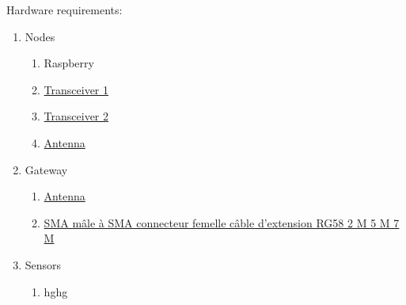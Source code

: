 
Hardware requirements:
	\begin{enumerate}
		\item Nodes
		\begin{enumerate}
			\item Raspberry
			\item \href{http://modtronix.com/inair9.html}
			{Transceiver 1}
			\item \href{https://fr.farnell.com/hoperf/rfm95w-868s2/transceiver-868mhz-fsk-ook/dp/2759294}
			{Transceiver 2}
			\item \href{http://modtronix.com/ant-f105-868.html}
			{Antenna}
		\end{enumerate}

		\item Gateway
		\begin{enumerate}
			\item \href{https://fr.aliexpress.com/store/product/868mhz-antenna-3dBi-omni-fiberglass-antenna-best-price-factory-outlet-antenna-basestation-antenna/2201026_32801738509.html?spm=2114.12010612%2Fitm2home-1.8148356.17.3b56c2deuuEg0k}
			{Antenna}
			\item \href{https://fr.aliexpress.com/item/SMA-Maleto-SMA-Female-Plug-RightangleConnector-Extension-Cable-RG582M/32543987605.html?spm=a2g0s.13010 208.99999999.258.14bb3c002VqZWY}
			{SMA mâle à SMA connecteur femelle câble d'extension RG58 2 M 5 M 7 M}
		\end{enumerate}
	
	\item Sensors
		\begin{enumerate}
		\item hghg
		\end{enumerate}
	
	\end{enumerate}







